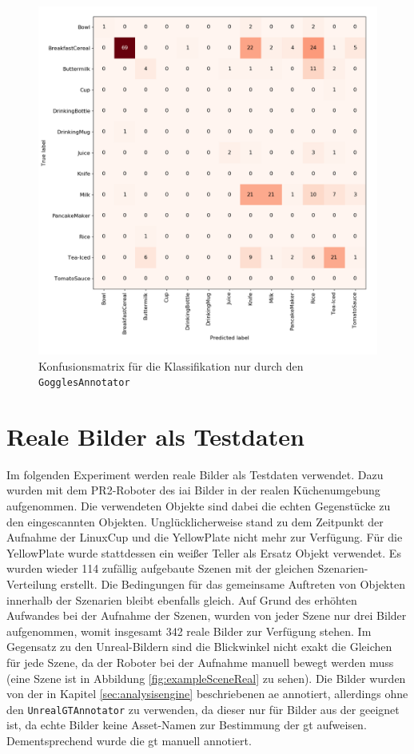 \begin{figure}
	\includegraphics[scale=.27]{img/chapter6/unrealEx1_goggles}	
\caption[Konfusionsmatrix für die Klassifikation nur durch den \texttt{GogglesAnnotator}]{Konfusionsmatrix für die Klassifikation nur durch den \texttt{GogglesAnnotator}}
\label{fig:singleEvidencesGog}
\end{figure}

\section{Reale Bilder als Testdaten}

Im folgenden Experiment werden reale Bilder als Testdaten verwendet. Dazu wurden mit dem PR2-Roboter des \gls{iai} Bilder in der realen Küchenumgebung aufgenommen. Die verwendeten Objekte sind dabei die echten Gegenstücke zu den eingescannten Objekten. Unglücklicherweise stand zu dem Zeitpunkt der Aufnahme der LinuxCup und die YellowPlate nicht mehr zur Verfügung. Für die YellowPlate wurde stattdessen ein weißer Teller als Ersatz Objekt verwendet. Es wurden wieder 114 zufällig aufgebaute Szenen mit der gleichen Szenarien-Verteilung erstellt. Die Bedingungen für das gemeinsame Auftreten von Objekten innerhalb der Szenarien bleibt ebenfalls gleich. Auf Grund des erhöhten Aufwandes bei der Aufnahme der Szenen, wurden von jeder Szene nur drei Bilder aufgenommen, womit insgesamt 342 reale Bilder zur Verfügung stehen. Im Gegensatz zu den Unreal-Bildern sind die Blickwinkel nicht exakt die Gleichen für jede Szene, da der Roboter bei der Aufnahme manuell bewegt werden muss (eine Szene ist in Abbildung \ref{fig:exampleSceneReal} zu sehen). Die Bilder wurden von der in Kapitel \ref{sec:analysisengine} beschriebenen \gls{ae} annotiert, allerdings ohne den \texttt{UnrealGTAnnotator} zu verwenden, da dieser nur für Bilder aus der \unreal geeignet ist, da echte Bilder keine Asset-Namen zur Bestimmung der \gls{gt} aufweisen. Dementsprechend wurde die \gls{gt} manuell annotiert.

